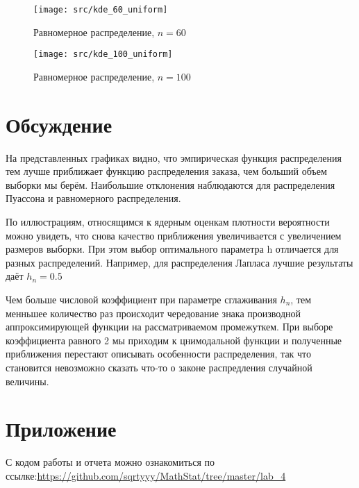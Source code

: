 \documentclass[a4paper]{article}
\begin{document}
\begin{figure}[H]
	\centering
	{\texttt{[image: src/kde\_60\_uniform]}}
		\caption{Равномерное распределение, $n=60$}
		\label{fig:kde_uniform_60}
	\end{figure}

\begin{figure}[H]
	\centering
	{\texttt{[image: src/kde\_100\_uniform]}}
		\caption{Равномерное распределение, $n=100$}
		\label{fig:kde_uniform_100}
	\end{figure}
\section{Обсуждение}
На представленных графиках видно, что эмпирическая функция распределения тем лучше приближает функцию распределения заказа, чем больший объем выборки мы берём. Наибольшие отклонения наблюдаются для распределения Пуассона и равномерного распределения.


По иллюстрациям, относящимся к ядерным оценкам плотности вероятности можно увидеть, что снова качество приближения увеличивается с увеличением размеров выборки. При этом выбор оптимального параметра h отличается для разных распределений. Например, для распределения Лапласа лучшие результаты даёт $h_n=0.5$

Чем больше числовой коэффициент при параметре сглаживания $h_n$, тем менньшее количество раз происходит чередование знака производной аппроксимирующей функции на рассматриваемом промежуткем. При выборе коэффициента равного 2 мы приходим к цнимодальной функции и полученные приближения перестают описывать особенности распределения, так что становится невозможно сказать что-то о законе распредления случайной величины.



\section{Приложение}

С кодом работы и отчета можно ознакомиться по ссылке:\;\url{https://github.com/sqrtyyy/MathStat/tree/master/lab_4}
\end{document}
